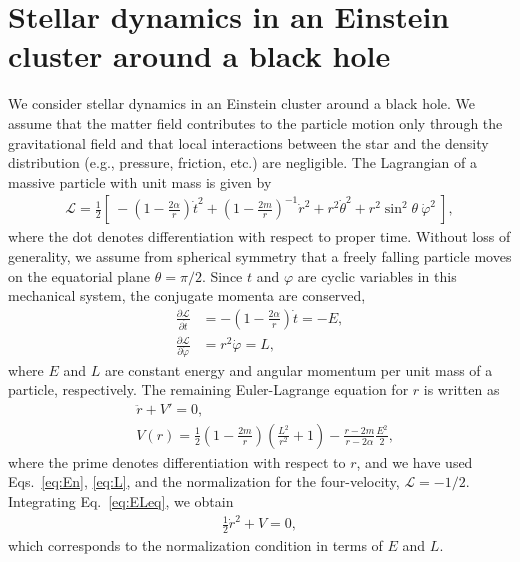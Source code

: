 \documentclass[aps,11pt,nofootinbib,preprintnumbers,groupedaddress,superscriptaddress]{revtex4-2}
\begin{document}
\section{Stellar dynamics in an Einstein cluster around a black hole}
\label{sec:3}
We consider stellar
dynamics in an Einstein cluster around a black hole. 
We assume that the matter field contributes to the particle motion only through the gravitational field and that local interactions between the 
star and the 
density distribution
(e.g., pressure, friction, etc.) are negligible.
The Lagrangian of 
a massive particle
with unit mass is given by
\begin{align}
\label{eq:Lagra}
\mathscr{L}=\frac{1}{2} \left[\:\!
-\left(1-\frac{2\alpha}{r}\right) \dot{t}^2+\left(1-\frac{2m}{r}\right)^{-1} \dot{r}^2+r^2\dot{\theta}^2+r^2\sin^2\theta \:\!\dot{\varphi}^2
\:\!\right],
\end{align}
where the dot denotes differentiation with respect to proper time. 
Without loss of generality, we assume from spherical symmetry that a freely falling particle moves on the equatorial plane $\theta=\pi/2$. 
Since $t$ and $\varphi$ are cyclic variables in this mechanical system, 
the conjugate momenta 
are conserved, 
\begin{align}
\label{eq:En}
\frac{\partial \mathscr{L}}{\partial \dot{t}}&=-\left(1-\frac{2\alpha}{r}\right) \dot{t}=-E,
\\
\label{eq:L}
\frac{\partial \mathscr{L}}{\partial \dot{\varphi}}&=r^2 \dot{\varphi}=L,
\end{align}
where $E$ and $L$ are constant energy and angular momentum per unit mass of a particle, 
respectively. 
The remaining Euler-Lagrange equation for $r$ is written as
\begin{align}
\label{eq:ELeq}
&\ddot{r}+V'=0,
\\
&V(r)=\frac{1}{2}\left(1-\frac{2m}{r}\right)\left(\frac{L^2}{r^2}+1\right)-\frac{r-2m}{r-2\alpha}\frac{E^2}{2},
\end{align}
where the prime denotes differentiation with respect to $r$, and we have used Eqs.~\eqref{eq:En}, \eqref{eq:L}, and the normalization for the four-velocity, 
$\mathscr{L}=-1/2$. Integrating Eq.~\eqref{eq:ELeq}, we obtain
\begin{align}
\label{eq:constr}
\frac{1}{2}\dot{r}^2+V=0,
\end{align}
which corresponds to the normalization condition in terms of $E$ and $L$. 
\end{document}
